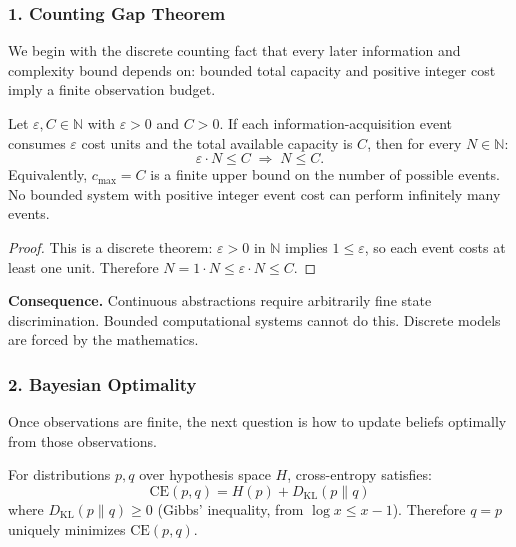 \subsubsection{1. Counting Gap Theorem}

We begin with the discrete counting fact that every later information and complexity bound depends on: bounded total capacity and positive integer cost imply a finite observation budget.

\begin{theorem}\label{thm:counting-gap-intro}
Let $\varepsilon, C \in \mathbb{N}$ with $\varepsilon > 0$ and $C > 0$. If each information-acquisition event consumes $\varepsilon$ cost units and the total available capacity is $C$, then for every $N \in \mathbb{N}$:
\[
  \varepsilon \cdot N \leq C \;\Rightarrow\; N \leq C.
\]
Equivalently, $c_{\max}=C$ is a finite upper bound on the number of possible events. No bounded system with positive integer event cost can perform infinitely many events.
\end{theorem}

\begin{proof}
This is a discrete theorem: $\varepsilon > 0$ in $\mathbb{N}$ implies $1 \leq \varepsilon$, so each event costs at least one unit. Therefore $N = 1\cdot N \leq \varepsilon \cdot N \leq C$.
\end{proof}

\noindent\textbf{Consequence.} Continuous abstractions require arbitrarily fine state discrimination. Bounded computational systems cannot do this. Discrete models are forced by the mathematics.

\subsubsection{2. Bayesian Optimality}

Once observations are finite, the next question is how to update beliefs optimally from those observations.

\begin{theorem}\label{thm:bayes-optimal}
For distributions $p, q$ over hypothesis space $H$, cross-entropy satisfies:
\[
  \mathrm{CE}(p, q) = H(p) + D_{\mathrm{KL}}(p \| q)
\]
where $D_{\mathrm{KL}}(p \| q) \geq 0$ (Gibbs' inequality, from $\log x \leq x - 1$).
Therefore $q = p$ uniquely minimizes $\mathrm{CE}(p, q)$.
\end{theorem}

